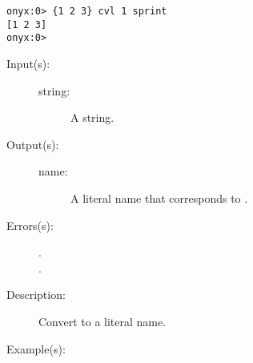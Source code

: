 \begin{description}
\begin{description}
\begin{verbatim}
onyx:0> {1 2 3} cvl 1 sprint
[1 2 3]
onyx:0>
		\end{verbatim}
	\end{description}
\label{systemdict:cvn}
\item[{\onyxop{string}{cvn}{name}}: ]
	\begin{description}\item[]
	\item[Input(s): ]
		\begin{description}\item[]
		\item[string: ]
			A string.
		\end{description}
	\item[Output(s): ]
		\begin{description}\item[]
		\item[name: ]
			A literal name that corresponds to .
		\end{description}
	\item[Errors(s): ]
		\begin{description}\item[]
		\item[.]
		\item[.]
		\end{description}
	\item[Description: ]
		Convert  to a literal name.
	\item[Example(s): ]\begin{verbatim}


\end{verbatim}
\end{description}
\end{description}
